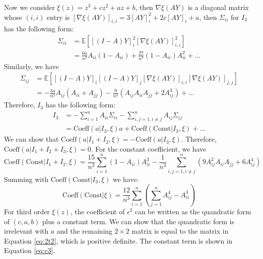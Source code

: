 \documentclass{article}
\def\E{\mathbb{E}}
\begin{document}
Now we consider $ \xi(z) = z^3 + cz^2 + az + b$, then $\nabla \xi (AY) $ is a diagonal matrix whose $(i,i)$ entry is 
 $[\nabla \xi (AY)]_{i,i} = 3 [AY]_i^2 + 2c [AY]_i + a $, then $\Sigma_{ii}$ for $I_3$ has the following form:
\begin{align*}
\Sigma_{ii} & = \E[ [(I-A)Y]_i^2 [\nabla \xi(AY)]_{i,i}^2] \\
& =  \frac{6a}{n^2} A_{ii}(1-A_{ii}) + \frac{27}{n^3} (1-A_{ii})A_{ii}^2 + \dots
\end{align*}
Similarly, we have
\begin{align*}
\Sigma_{ij} & = \E[ [(I-A)Y]_i [(I-A)Y]_j [\nabla \xi(AY)]_{i,i} [\nabla \xi(AY)]_{j,j}] \\
& = -\frac{3a}{n^2} A_{ij}(A_{ii}+A_{jj}) - \frac{9}{n^3}(A_{ij}A_{ii} A_{jj} + 2 A_{ij}^3) + \dots
\end{align*}
Therefore, $I_3$ has the following form:
\begin{align*}
I_3 & = - \sum_{i=1}^n A_{ii} \Sigma_{ii} - \sum_{i,j=1, i\neq j}^n A_{ij} \Sigma_{ij} \\
& = \textrm{Coeff}(a | I_3, \xi) a  + \textrm{Coeff}( \textrm{Const} | I_3, \xi) + \dots
\end{align*}
We can show that $\textrm{Coeff}(a | I_1 + I_2, \xi) =- \textrm{Coeff}(a | I_3, \xi)$. Therefore, $\textrm{Coeff}(a | I_1 + I_2 + I_3, \xi) = 0$.
For the constant coefficient, we have
\begin{equation*}
\textrm{Coeff}(\textrm{Const} | I_1 + I_2, \xi) = \frac{15}{n^3}\sum_{i=1}^n (1-A_{ii}) A_{ii}^3 - \frac{1}{n^3}\sum_{i,j=1,i\neq j}^n (9 A^2_{ij} A_{ii}A_{jj} + 6 A_{ij}^4)
\end{equation*}
Summing with $\textrm{Coeff}(\textrm{Const} | I_3, \xi) $ we have:
\begin{equation}\label{eq:c3}
\textrm{Coeff}(\textrm{Const} | \xi) = \frac{12}{n^3} \sum_{i=1}^n (\sum_{j=1}^n A_{ij}^4 - A_{ii}^3)
\end{equation}
For third order $\xi(z)$, the coefficient of $\epsilon^2$ can be written as the quandratic form of $(c,a,b)$ plus a constant term. We can show that the quandratic form is irrelevant with $a$ and the remaining $2\times 2 $ matrix is equal to the matrix in Equation \eqref{eq:2t2}, which is positive definite. The constant term is shown in Equation \eqref{eq:c3}.
\end{document}
